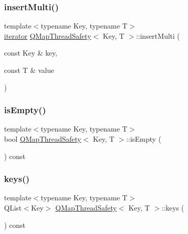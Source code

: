 \mbox{\label{class_q_map_thread_safety_adb0bc3f6ee968de8b71a141bcc517d4c}} 
\subsubsection{\texorpdfstring{insert\+Multi()}{insertMulti()}}
{\footnotesize\ttfamily template$<$typename Key, typename T$>$ \\
\hyperlink{class_q_map_thread_safety_a454c8af3f68e6d61aecaf1b918aa525b}{iterator} \hyperlink{class_q_map_thread_safety}{Q\+Map\+Thread\+Safety}$<$ Key, T $>$\+::insert\+Multi (\begin{DoxyParamCaption}\item[{const Key \&}]{key,  }\item[{const T \&}]{value }\end{DoxyParamCaption})\hspace{0.3cm}{\ttfamily [inline]}}

\mbox{\label{class_q_map_thread_safety_a2dc915bd74285298d93eb17440587931}} 
\subsubsection{\texorpdfstring{is\+Empty()}{isEmpty()}}
{\footnotesize\ttfamily template$<$typename Key, typename T$>$ \\
bool \hyperlink{class_q_map_thread_safety}{Q\+Map\+Thread\+Safety}$<$ Key, T $>$\+::is\+Empty (\begin{DoxyParamCaption}{ }\end{DoxyParamCaption}) const\hspace{0.3cm}{\ttfamily [inline]}}

\mbox{\label{class_q_map_thread_safety_a51d0d694a419e2d0958b16f7089ab444}} 
\subsubsection{\texorpdfstring{keys()}{keys()}\hspace{0.1cm}{\footnotesize\ttfamily [1/2]}}
{\footnotesize\ttfamily template$<$typename Key, typename T$>$ \\
Q\+List$<$Key$>$ \hyperlink{class_q_map_thread_safety}{Q\+Map\+Thread\+Safety}$<$ Key, T $>$\+::keys (\begin{DoxyParamCaption}{ }\end{DoxyParamCaption}) const\hspace{0.3cm}{\ttfamily [inline]}}

